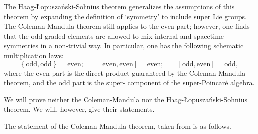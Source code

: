 \documentclass[a4paper]{report}
\theoremstyle{definition}
\theoremstyle{plain}
\theoremstyle{remark}
\begin{document}
The Haag-{\L}opusza{\'n}ski-Sohnius theorem generalizes the assumptions of this theorem by expanding the definition of `symmetry' to include super Lie groups. The Coleman-Mandula theorem still applies to the even part; however, one finds that the odd-graded elements are allowed to mix internal and spacetime symmetries in a non-trivial way. In particular, one has the following schematic multiplication laws:
\begin{equation*}
  \left\{ \text{odd}, \text{odd} \right\} = \text{even};\qquad \left[ \text{even}, \text{even} \right] = \text{even};\qquad \left[ \text{odd}, \text{even} \right] = \text{odd},
\end{equation*}
where the even part is the direct product guaranteed by the Coleman-Mandula theorem, and the odd part is the super- component of the super-Poincar{\'e} algebra.

We will prove neither the Coleman-Mandula nor the Haag-{\L}opusza{\'n}ski-Sohnius theorem. We will, however, give their statements.

The statement of the Coleman-Mandula theorem, taken from \cite{muller-kirsen-wiedmann-intro-susy} is as follows.
\end{document}
